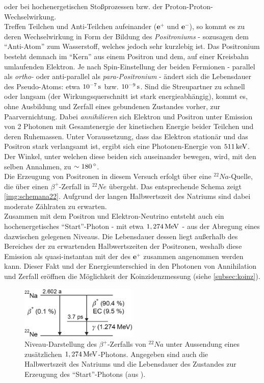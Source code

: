 \documentclass[numbers=noenddot,a4paper]{scrartcl}
\newcommand{\degree}{^\circ}
\newcommand{\tenpo}[1]{ 10^{#1}}
\newcommand{\tilt}[1]{\textit{#1}}
\begin{document}
			oder bei hochenergetischen Stoßprozessen bzw. der Proton-Proton-Wechselwirkung.\\
			Treffen Teilchen und Anti-Teilchen aufeinander ($\textbf{e}^+$ und $\textbf{e}^-$), so kommt es zu deren Wechselwirkung in Form der Bildung des \tilt{Positroniums} - sozusagen dem "`Anti-Atom"' zum Wasserstoff, welches jedoch sehr kurzlebig ist. Das Positronium besteht demnach im "`Kern"' aus einem Positron und dem, auf einer Kreisbahn umlaufenden Elektron. Je nach Spin-Einstellung der beiden Fermionen - parallel als \tilt{ortho-} oder anti-parallel als \tilt{para-Positronium} - ändert sich die Lebensdauer des Pseudo-Atoms: etwa $\unit[\tenpo{-7}]{s}$ bzw. $\unit[\tenpo{-9}]{s}$. Sind die Streupartner zu schnell oder langsam (der Wirkungsquerschnitt ist stark energieabhängig), kommt es, ohne Ausbildung und Zerfall eines gebundenen Zustandes vorher, zur Paarvernichtung. Dabei \tilt{annihilieren} sich Elektron und Positron unter Emission von 2 Photonen mit Gesamtenergie der kinetischen Energie beider Teilchen und deren Ruhemassen. Unter Voraussetzung, dass das Elektron stationär und das Positron stark verlangsamt ist, ergibt sich eine Photonen-Energie von $\unit[511]{keV}$. Der Winkel, unter welchen diese beiden sich auseinander bewegen, wird, mit den selben Annahmen, zu $\sim\unit[180]{\degree}$.\\
			Die Erzeugung von Positronen in diesem Versuch erfolgt über eine $^{22}Na$-Quelle, die über einen $\beta^+$-Zerfall in $^{22}Ne$ übergeht. Das entsprechende Schema zeigt \autoref{img:schemana22}. Aufgrund der langen Halbwertszeit des Natriums sind dabei moderate Zählraten zu erwarten.\\
			Zusammen mit dem Positron und Elektron-Neutrino entsteht auch ein hochenergetisches "`Start"'-Photon - mit etwa $\unit[1,274]{MeV}$ - aus der Abregung eines dazwischen gelegenen Niveaus. Die Lebensdauer dessen liegt außerhalb des Bereiches der zu erwartenden Halbwertszeiten der Positronen, weshalb diese Emission als quasi-instantan mit der des $\textbf{e}^+$ zusammen angenommen werden kann. Dieser Fakt und der Energieunterschied in den Photonen von Annihilation und Zerfall eröffnen die Möglichkeit der Koinzidenzmessung (siehe \ref{subsec:koinz}).\\

							\begin{figure}[t]
								\centering
								\includegraphics[width=0.5\textwidth]{termschema.png}
								\caption{Niveau-Darstellung des $\beta^+$-Zerfalls von $^{22}Na$ unter Aussendung eines zusätzlichen $\unit[1,274]{MeV}$-Photons. Angegeben sind auch die Halbwertszeit des Natriums und die Lebensdauer des Zustandes zur Erzeugung des "`Start"'-Photons (aus \cite{Augsten08}).}
								\label{img:schemana22}
							\end{figure}
\end{document}
